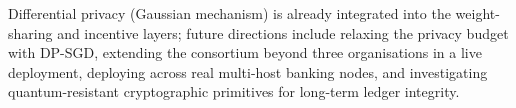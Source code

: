 Differential privacy (Gaussian mechanism) is already integrated into the weight-sharing and incentive layers; future directions include relaxing the privacy budget with DP-SGD, extending the consortium beyond three organisations in a live deployment, deploying across real multi-host banking nodes, and investigating quantum-resistant cryptographic primitives for long-term ledger integrity.
